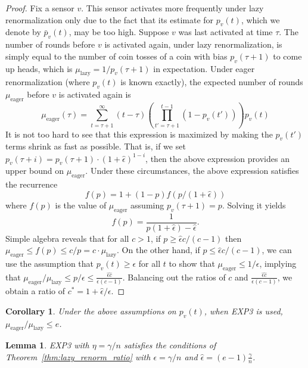 \documentclass{sig-alternate-dan}
\numberwithin{equation}{section}
\newcommand{\algofont}[1]{\textsc{#1}}
\newcommand{\EXPthree}{{\algofont{EXP3}}\xspace}
\newcommand{\numsensors}{\ensuremath{n}}
\newcommand{\sensor}{\ensuremath{v}}
\newcommand{\mueager}{\ensuremath{\mu_{\text{eager}}}}
\newcommand{\mulazy}{\ensuremath{\mu_{\text{lazy}}}}
\newcommand{\paren} [1] {\ensuremath{ \left( {#1} \right) }}
\newtheorem{lemma}{Lemma}
\newtheorem{cor}[theorem]{Corollary}
\begin{document}
{{\begin{proof}
Fix a sensor $\sensor$.  This sensor activates more frequently under
lazy renormalization only due to the fact that its estimate for 
$p_{\sensor}(t)$, which we denote by $\bar{p}_{\sensor}(t)$, may be too high.
Suppose $\sensor$ was last activated at time $\tau$.
%
%
The number of rounds before $\sensor$ is activated again, under lazy
renormalization, is simply equal to the number of coin tosses of
a coin with bias $p_{\sensor}(\tau+1)$ to come up heads, which is 
$\mulazy = 1/p_{\sensor}(\tau+1)$ in expectation.
Under eager renormalization (where $p_{\sensor}(t)$ is known exactly), 
the expected number of rounds $\mueager$ before $\sensor$ is activated again is 
\[
\mueager(\tau) = \sum_{t = \tau+1}^{\infty} \paren{t-\tau}\paren{\prod_{t'=\tau+1}^{t-1}
  \paren{1 - p_{\sensor}(t')}}p_{\sensor}(t) 
\]
%
%
It is not too hard to see that this expression is maximized by making
the $p_{\sensor}(t')$ terms shrink as fast as possible.
That is, if we set 
$p_{\sensor}(\tau+i) = p_{\sensor}(\tau+1) \cdot \paren{1+\hat{\epsilon}}^{1-i}$, then 
the above expression provides an upper bound on $\mueager$.
Under these circumstances, the above expression satisfies the recurrence
\[
f(p) = 1 + (1-p)f(p/(1+\hat{\epsilon}))
\] 
where $f(p)$ is the value of $\mueager$ assuming $p_{\sensor}(\tau+1) = p$.
Solving it yields 
\[
f(p) = \frac{1}{p(1+\hat{\epsilon}) - \hat{\epsilon}} \mbox{.}
\]
Simple algebra reveals that for all $c > 1$, if $p \ge \hat{\epsilon}c/(c-1)$ then 
$\mueager \le f(p) \le c/p = c \cdot \mulazy$.
On the other hand, if $p \le \hat{\epsilon}c/(c-1)$, we can use the
assumption that $p_{\sensor}(t) \ge \epsilon$ for all $t$ to show that 
$\mueager \le 1/\epsilon$, implying 
that $\mueager/\mulazy \le p/\epsilon \le \frac{\hat{\epsilon
    c}}{\epsilon (c-1)}$.  Balancing out the ratios of $c$ and
$\frac{\hat{\epsilon c}}{\epsilon (c-1)}$, we obtain a ratio of 
$c^* = 1 + \hat{\epsilon}/\epsilon$.
\end{proof}

\begin{cor}
Under the above assumptions on $p_{\sensor}(t)$, when \EXPthree is used, 
$\mueager / \mulazy \le e$.
\end{cor}
} %

\begin{lemma} \label{lem:exp3conditions}
\EXPthree with $\eta = \gamma/n$ 
satisfies the conditions of Theorem~\ref{thm:lazy_renorm_ratio} 
with $\epsilon = \gamma/\numsensors$ and $\hat{\epsilon} =
(e-1)\frac{\gamma}{\numsensors}$.
\end{lemma}

}
\end{document}
